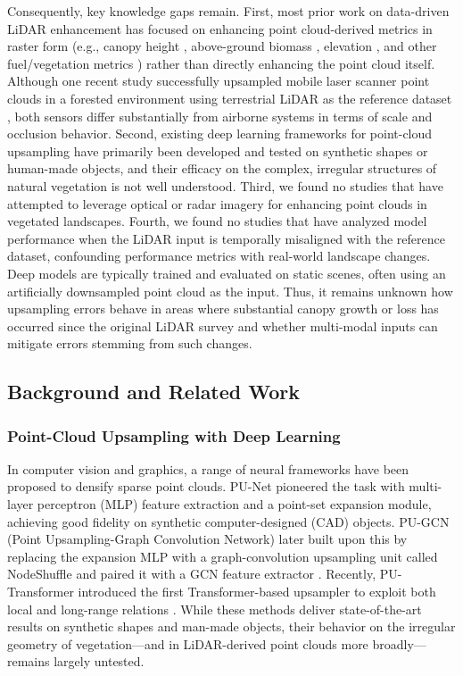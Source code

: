 \documentclass[remotesensing,article,accept,pdftex,moreauthors]{Definitions/mdpi}
\renewcommand{\hl}[1]{#1}
\begin{document}
Consequently, key knowledge gaps remain. First, most prior work on data-driven LiDAR enhancement has focused on enhancing point cloud-derived metrics in raster form (e.g., canopy height \cite{wilkes_mapping_2015, wagner_sub-meter_2024}, above-ground biomass \cite{shendryk2022fusing}, elevation \cite{li2023large}, and other fuel/vegetation metrics \cite{taneja2023up, gazzea2023high}) rather than directly enhancing the point cloud itself. Although one recent study successfully upsampled mobile laser scanner point clouds in a forested environment using terrestrial LiDAR as the reference dataset \cite{remijnse2024upsampling}, both sensors differ substantially from airborne systems in terms of scale and occlusion behavior. Second, existing deep learning frameworks for point-cloud upsampling have primarily been developed and tested on synthetic shapes or human-made objects, and their efficacy on the complex, irregular structures of natural vegetation is not well understood. Third, we found no studies that have attempted to leverage optical or radar imagery for enhancing point clouds in vegetated landscapes. Fourth, we found no studies that have analyzed model performance when the LiDAR input is temporally misaligned with the reference dataset, confounding performance metrics with real-world landscape changes. Deep models are typically trained and evaluated on static scenes, often using an artificially downsampled point cloud as the input. Thus, it remains unknown how upsampling errors behave in areas where substantial canopy growth or loss has occurred since the original LiDAR survey and whether multi-modal inputs can mitigate errors stemming from such changes.

\subsection{Background and Related Work}

\subsubsection{Point-Cloud Upsampling with Deep Learning}

In computer vision and graphics, a range of neural frameworks have been proposed to densify sparse point clouds. PU-Net \cite{yu2018pu} pioneered the task with multi-layer perceptron (MLP) feature extraction and a point-set expansion module, achieving good fidelity on synthetic computer-designed (CAD) objects. PU-GCN (Point Upsampling-Graph Convolution Network) later built upon this by replacing the expansion MLP with a graph-convolution upsampling unit called \hl{NodeShuffle} %
and paired it with a GCN feature extractor \cite{qian2021pu}. Recently, PU-Transformer introduced the first Transformer-based upsampler to exploit both local and long-range relations \cite{qiu2022pu}. While these methods deliver state-of-the-art results on synthetic shapes and man-made objects, their behavior on the irregular geometry of vegetation—and in LiDAR-derived point clouds more broadly—remains largely untested.
\end{document}
